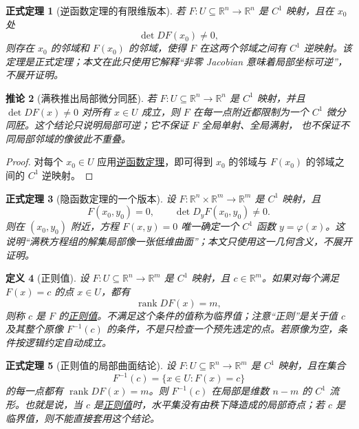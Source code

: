 \documentclass[UTF8,fontset=none,a4paper,11pt]{ctexart}
\theoremstyle{foundation-definition}
\newtheorem{definition}{定义}[section]
\theoremstyle{foundation-theorem}
\newtheorem{theorem}[definition]{正式定理}
\theoremstyle{foundation-proposition}
\theoremstyle{foundation-example}
\theoremstyle{foundation-remark}
\theoremstyle{foundation-theorem}
\newtheorem{corollary}[definition]{推论}
\newcommand{\term}[2]{\hyperref[#1]{#2}}
\begin{document}
\begin{theorem}[逆函数定理的有限维版本]\label{thm:inverse-function}
若 \(F:U\subseteq\mathbb R^n\to\mathbb R^n\) 是 \(C^1\) 映射，且在 \(x_0\) 处
\[
\det DF(x_0)\neq0,
\]
则存在 \(x_0\) 的邻域和 \(F(x_0)\) 的邻域，使得 \(F\) 在这两个邻域之间有 \(C^1\) 逆映射。该定理是正式定理；本文在此只使用它解释“非零 Jacobian 意味着局部坐标可逆”，不展开证明。
\end{theorem}

\begin{corollary}[满秩推出局部微分同胚]\label{cor:full-rank-local-diffeomorphism}
若 \(F:U\subseteq\mathbb R^n\to\mathbb R^n\) 是 \(C^1\) 映射，并且
\(\det DF(x)\ne0\) 对所有 \(x\in U\) 成立，则 \(F\) 在每一点附近都限制为一个
\(C^1\) 微分同胚。这个结论只说明局部可逆；它不保证 \(F\) 全局单射、全局满射，
也不保证不同局部邻域的像彼此不重叠。
\end{corollary}

\begin{proof}
对每个 \(x_0\in U\) 应用\term{thm:inverse-function}{逆函数定理}，即可得到
\(x_0\) 的邻域与 \(F(x_0)\) 的邻域之间的 \(C^1\) 逆映射。\end{proof}

\begin{theorem}[隐函数定理的一个版本]
设 \(F:\mathbb R^{n}\times\mathbb R^{m}\to\mathbb R^{m}\) 是 \(C^1\) 映射，且
\[
F(x_0,y_0)=0,\qquad
\det D_yF(x_0,y_0)\neq0.
\]
则在 \((x_0,y_0)\) 附近，方程 \(F(x,y)=0\) 唯一确定一个 \(C^1\) 函数 \(y=\varphi(x)\)。这说明“满秩方程组的解集局部像一张低维曲面”；本文只使用这一几何含义，不展开证明。
\end{theorem}

\begin{definition}[正则值]\label{def:regular-value}
设 \(F:U\subseteq\mathbb R^n\to\mathbb R^m\) 是 \(C^1\) 映射，且 \(c\in\mathbb R^m\)。如果对每个满足 \(F(x)=c\) 的点 \(x\in U\)，都有
\[
 \operatorname{rank}DF(x)=m,
\]
则称 \(c\) 是 \(F\) 的\term{def:regular-value}{正则值}。不满足这个条件的值称为临界值；注意“正则”是关于值 \(c\) 及其整个原像 \(F^{-1}(c)\) 的条件，不是只检查一个预先选定的点。若原像为空，条件按逻辑约定自动成立。
\end{definition}

\begin{theorem}[正则值的局部曲面结论]
设 \(F:U\subseteq\mathbb R^n\to\mathbb R^m\) 是 \(C^1\) 映射，且在集合
\[
F^{-1}(c)=\{x\in U:F(x)=c\}
\]
的每一点都有 \(\operatorname{rank}DF(x)=m\)。则 \(F^{-1}(c)\) 在局部是维数 \(n-m\) 的 \(C^1\) 流形。也就是说，当 \(c\) 是\term{def:regular-value}{正则值}时，水平集没有由秩下降造成的局部奇点；若 \(c\) 是临界值，则不能直接套用这个结论。
\end{theorem}
\end{document}
